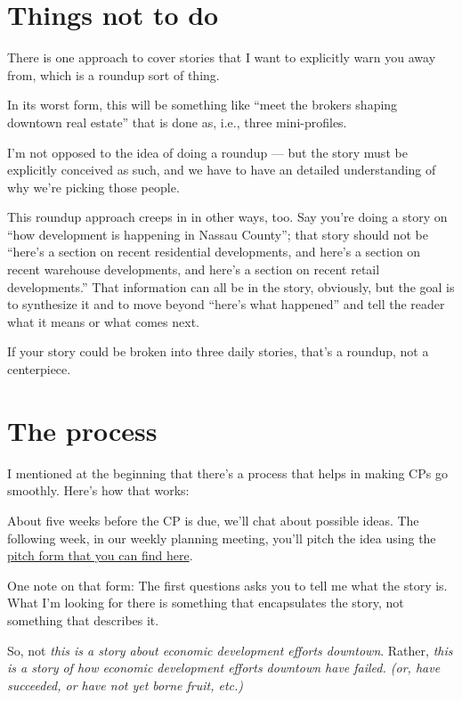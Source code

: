 \documentclass[
  12pt,
  american,
  letterpaperpaper,
  extrafontsizes,onecolumn,openright
  ]{memoir}
\begin{document}
\hypertarget{things-not-to-do}{%
\section*{Things not to do}\label{things-not-to-do}}

There is one approach to cover stories that I want to explicitly warn you away from, which is a roundup sort of thing.

In its worst form, this will be something like \enquote{meet the brokers shaping downtown real estate} that is done as, i.e., three mini-profiles.

I'm not opposed to the idea of doing a roundup --- but the story must be explicitly conceived as such, and we have to have an detailed understanding of why we're picking those people.

This roundup approach creeps in in other ways, too. Say you're doing a story on \enquote{how development is happening in Nassau County}; that story should not be \enquote{here's a section on recent residential developments, and here's a section on recent warehouse developments, and here's a section on recent retail developments.} That information can all be in the story, obviously, but the goal is to synthesize it and to move beyond \enquote{here's what happened} and tell the reader what it means or what comes next.

If your story could be broken into three daily stories, that's a roundup, not a centerpiece.

\hypertarget{the-process}{%
\section*{The process}\label{the-process}}

I mentioned at the beginning that there's a process that helps in making CPs go smoothly. Here's how that works:

About five weeks before the CP is due, we'll chat about possible ideas. The following week, in our weekly planning meeting, you'll pitch the idea using the \href{https://bizj.us/1qk3qi}{pitch form that you can find here}.

One note on that form: The first questions asks you to tell me what the story is. What I'm looking for there is something that encapsulates the story, not something that describes it.

So, not \emph{this is a story about economic development efforts downtown}. Rather, \emph{this is a story of how economic development efforts downtown have failed. (or, have succeeded, or have not yet borne fruit, etc.)}
\end{document}
